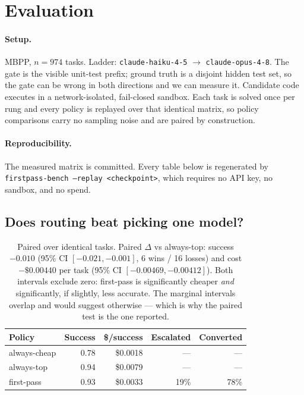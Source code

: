 \documentclass[11pt]{article}
\begin{document}
\section{Evaluation}
\label{sec:eval}

\paragraph{Setup.} MBPP, $n = 974$ tasks. Ladder: \texttt{claude-haiku-4-5} $\rightarrow$ \texttt{claude-opus-4-8}. The gate is the visible unit-test prefix; ground truth is a disjoint
hidden test set, so the gate can be wrong in both directions and we can measure it. Candidate code
executes in a network-isolated, fail-closed sandbox. Each task is solved once per rung and every
policy is replayed over that identical matrix, so policy comparisons carry no sampling noise and
are paired by construction.

\paragraph{Reproducibility.} The measured matrix is committed. Every table below is regenerated by
\texttt{firstpass-bench --replay <checkpoint>}, which requires no API key, no sandbox, and no
spend.

\subsection{Does routing beat picking one model?}
\label{sec:results-policy}

\begin{table}[h]
\centering
\begin{tabular}{@{}lrrrr@{}}
\toprule
\textbf{Policy} & \textbf{Success} & \textbf{\$/success} & \textbf{Escalated} & \textbf{Converted} \\
\midrule
always-cheap  & 0.78 & \$0.0018 & --- & --- \\
always-top    & 0.94 & \$0.0079 & --- & --- \\
first-pass    & 0.93 & \$0.0033 & 19\% & 78\% \\
\bottomrule
\end{tabular}
\caption{Paired over identical tasks. Paired $\Delta$ vs always-top: success
$-0.010$ (95\% CI $[-0.021, -0.001]$, 6 wins / 16 losses) and cost $-\$0.00440$ per task
(95\% CI $[-0.00469, -0.00412]$). Both intervals exclude zero: first-pass is significantly
cheaper \emph{and} significantly, if slightly, less accurate. The marginal intervals overlap and
would suggest otherwise --- which is why the paired test is the one reported.}
\end{table}
\end{document}
